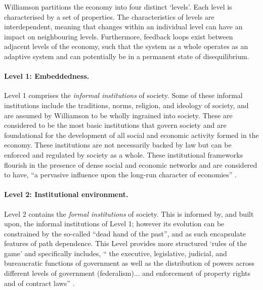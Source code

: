 Williamson partitions the economy into four distinct `levels'. Each level is characterised by a set of properties. The characteristics of levels are interdependent, meaning that changes within an individual level can have an impact on neighbouring levels. Furthermore, feedback loops exist between adjacent levels of the economy, such that the system as a whole operates as an adaptive system and can potentially be in a permanent state of disequilibrium.

\paragraph{Level 1: Embeddedness.}

Level 1 comprises the \emph{informal institutions} of society. Some of these informal institutions include the traditions, norms, religion, and ideology of society, and are assumed by Williamson to be wholly ingrained into society. These are considered to be the most basic institutions that govern society and are foundational for the development of all social and economic activity formed in the economy. These institutions are not necessarily backed by law but can be enforced and regulated by society as a whole. These institutional frameworks flourish in the presence of dense social and economic networks and are considered to have, ``a pervasive influence upon the long-run character of economies'' \citep[p.~111]{North1991b}.

\paragraph{Level 2: Institutional environment.}

Level 2 contains the \emph{formal institutions} of society. This is informed by, and built upon, the informal institutions of Level 1; however its evolution can be constrained by the so-called ``dead hand of the past'', and as such encapsulate features of path dependence. This Level provides more structured `rules of the game' and specifically includes, `` the executive, legislative, judicial, and bureaucratic functions of government as well as the distribution of powers across different levels of government (federalism)... and enforcement of property rights and of contract laws'' \citep[p.~589]{Williamson2000}.

